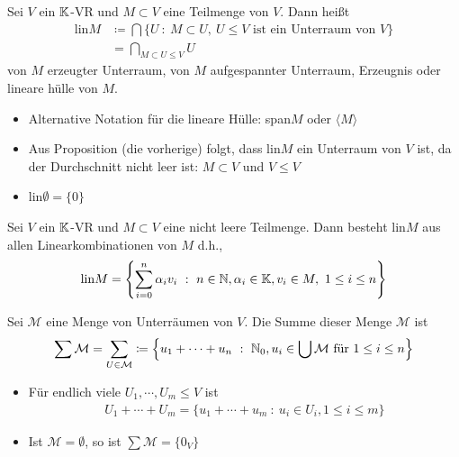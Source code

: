 \begin{definition}
    Sei $V$ ein $\mathbb{K}$-VR und $M\subset V$ eine Teilmenge von $V$. Dann heißt
    \begin{align*}
        \text{lin} M&\coloneqq \bigcap\{U\ :\ M\subset U,\ U\leq V\text{ ist ein Unterraum von } V\} \\
        &= \bigcap_{M\subset U\leq V}U
    \end{align*}
    von $M$ erzeugter Unterraum, von $M$ aufgespannter Unterraum, Erzeugnis oder lineare hülle von $M$.
    \begin{itemize}
        \item Alternative Notation für die lineare Hülle: span$M$ oder $\langle M\rangle$
        \item Aus Proposition (die vorherige) folgt, dass lin$M$ ein Unterraum von $V$ ist, da der Durchschnitt nicht leer ist: $M\subset V$ und $ V\leq V$
        \item lin$\emptyset = \{0\}$
    \end{itemize}
\end{definition}

\begin{theorem}
Sei $V$ ein $\mathbb{K}$-VR und $M\subset V$ eine nicht leere Teilmenge.
Dann besteht lin$M$ aus allen Linearkombinationen von $M$ d.h.,
\begin{align*}
    \text{lin} M =\left\{\sum_{i=0}^n \alpha_i v_i\ :\ n\in\N,\alpha_i\in\K,v_i \in M,\ 1\leq i\leq n\right\}
\end{align*}
\end{theorem}

\begin{definition}
    Sei $\mathcal{M}$ eine Menge von Unterräumen von $V$. Die Summe dieser Menge $\mathcal{M}$ ist
    \begin{align*}
        \sum \mathcal{M} = \sum_{U\in \mathcal{M}} \coloneqq \left\{ u_1+\dotsb + u_n\ :\ \mathbb{N}_0, u_i\in\bigcup \mathcal{M} \text{ für } 1\leq i \leq n \right\}
    \end{align*}
    \begin{itemize}
        \item Für endlich viele $U_1,\dotsb, U_m\leq V$ ist 
        \begin{align*}
            U_1+\dotsb+U_m=\{u_1+\dotsb+u_m \ :\ u_i \in U_i, 1\leq i \leq m\}
        \end{align*}
        \item Ist $\mathcal{M}=\emptyset$, so ist $\sum \mathcal{M}=\{0_V\}$
    \end{itemize}
\end{definition}

